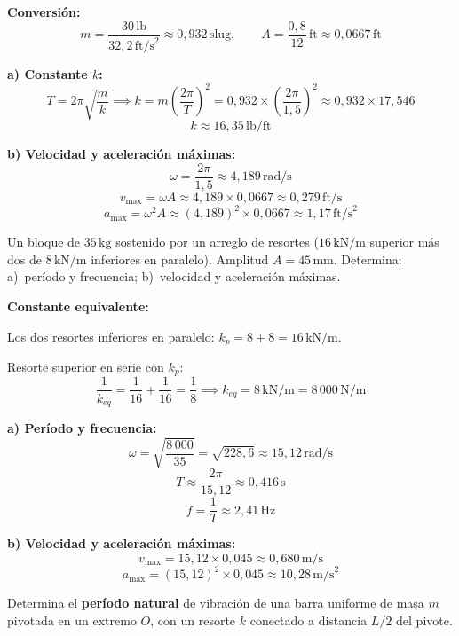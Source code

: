 \documentclass[12pt, a4paper, oneside]{book}
\newcommand{\Nm}{\,\text{N/m}}
\newcommand{\rad}{\,\text{rad/s}}
\newcommand{\Hz}{\,\text{Hz}}
\newcommand{\kg}{\,\text{kg}}
\newcommand{\ms}{\,\text{m/s}}
\newcommand{\mss}{\,\text{m/s}^{2}}
\begin{document}
\begin{solucion}
\textbf{Conversi\'on:}
\[
  m = \dfrac{30\,\text{lb}}{32{,}2\,\text{ft/s}^{2}} \approx 0{,}932\,\text{slug},\qquad
  A = \dfrac{0{,}8}{12}\,\text{ft} \approx 0{,}0667\,\text{ft}
\]

\textbf{a) Constante $k$:}
\[
  T = 2\pi\sqrt{\dfrac{m}{k}}
  \implies
  k = m\!\left(\dfrac{2\pi}{T}\right)^{\!2}
    = 0{,}932 \times \left(\dfrac{2\pi}{1{,}5}\right)^{\!2}
    \approx 0{,}932 \times 17{,}546
\]
\[
  \boxed{k \approx 16{,}35\,\text{lb/ft}}
\]

\textbf{b) Velocidad y aceleraci\'on m\'aximas:}
\[
  \omega = \dfrac{2\pi}{1{,}5} \approx 4{,}189\rad
\]
\[
  \boxed{v_{\max} = \omega A \approx 4{,}189 \times 0{,}0667 \approx 0{,}279\,\text{ft/s}}
\]
\[
  \boxed{a_{\max} = \omega^{2}A \approx (4{,}189)^{2} \times 0{,}0667 \approx 1{,}17\,\text{ft/s}^{2}}
\]
\end{solucion}

\begin{problema}[title={Problema~32 --- Beer, Johnston \& Cornwell (19.17)}]
Un bloque de $35\kg$ sostenido por un arreglo de resortes ($16\,\text{kN/m}$ superior
m\'as dos de $8\,\text{kN/m}$ inferiores en paralelo). Amplitud $A = 45\,\text{mm}$.
Determina: a)~per\'iodo y frecuencia; b)~velocidad y aceleraci\'on m\'aximas.
\end{problema}

\begin{solucion}
\textbf{Constante equivalente:}

Los dos resortes inferiores en paralelo: $k_{p} = 8 + 8 = 16\,\text{kN/m}$.

Resorte superior en serie con $k_{p}$:
\[
  \dfrac{1}{k_{eq}} = \dfrac{1}{16} + \dfrac{1}{16} = \dfrac{1}{8}
  \implies
  k_{eq} = 8\,\text{kN/m} = 8\,000\Nm
\]

\textbf{a) Per\'iodo y frecuencia:}
\[
  \omega = \sqrt{\dfrac{8\,000}{35}} = \sqrt{228{,}6} \approx 15{,}12\rad
\]
\[
  \boxed{T \approx \dfrac{2\pi}{15{,}12} \approx 0{,}416\,\text{s}}
\]
\[
  \boxed{f = \dfrac{1}{T} \approx 2{,}41\Hz}
\]

\textbf{b) Velocidad y aceleraci\'on m\'aximas:}
\[
  \boxed{v_{\max} = 15{,}12 \times 0{,}045 \approx 0{,}680\ms}
\]
\[
  \boxed{a_{\max} = (15{,}12)^{2} \times 0{,}045 \approx 10{,}28\mss}
\]
\end{solucion}

\begin{problema}[title={Problema~33 --- Hibbeler (22.12)}]
Determina el \textbf{per\'iodo natural} de vibraci\'on de una barra uniforme de masa $m$
pivotada en un extremo $O$, con un resorte $k$ conectado a distancia $L/2$ del pivote.
\end{problema}
\end{document}
